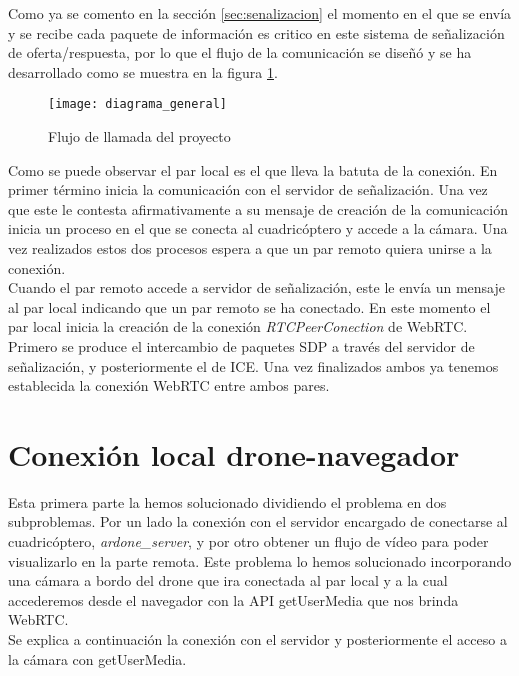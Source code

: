 Como ya se comento en la sección \ref{sec:senalizacion} el momento en el que se envía y se recibe cada paquete de información es critico en este sistema de señalización de oferta/respuesta, por lo que el flujo de la comunicación se diseñó y se ha desarrollado como se muestra en la figura \ref{fig:flujodellamada}.\\


\begin{figure}[h!]
\centering
\texttt{[image: diagrama\_general]}
\caption{Flujo de llamada del proyecto}
\label{fig:flujodellamada}
\end{figure}

Como se puede observar el par local es el que lleva la batuta de la conexión. En primer término inicia la comunicación con el servidor de señalización. Una vez que este le contesta afirmativamente a su mensaje de creación de la comunicación inicia un proceso en el que se conecta al cuadricóptero y accede a la cámara. Una vez realizados estos dos procesos espera a que un par remoto quiera unirse a la conexión.\\

Cuando el par remoto accede a servidor de señalización, este le envía un mensaje al par local indicando que un par remoto se ha conectado. En este momento el par local inicia la creación de la conexión \emph{RTCPeerConection} de WebRTC. Primero se produce el intercambio de paquetes SDP a través del servidor de señalización, y posteriormente el de ICE. Una vez finalizados ambos ya tenemos establecida la conexión WebRTC entre ambos pares.\\

\section{Conexión local drone-navegador}

Esta primera parte la hemos solucionado dividiendo el problema en dos subproblemas. Por un lado la conexión con el servidor encargado de conectarse al cuadricóptero, \emph{ardone\_server}, y por otro obtener un flujo de vídeo para poder visualizarlo en la parte remota. Este problema lo hemos solucionado incorporando una cámara a bordo del drone que ira conectada al par local y a la cual accederemos desde el navegador con la API getUserMedia que nos brinda WebRTC.\\

Se explica a continuación la conexión con el servidor y posteriormente el acceso a la cámara con getUserMedia.\\


